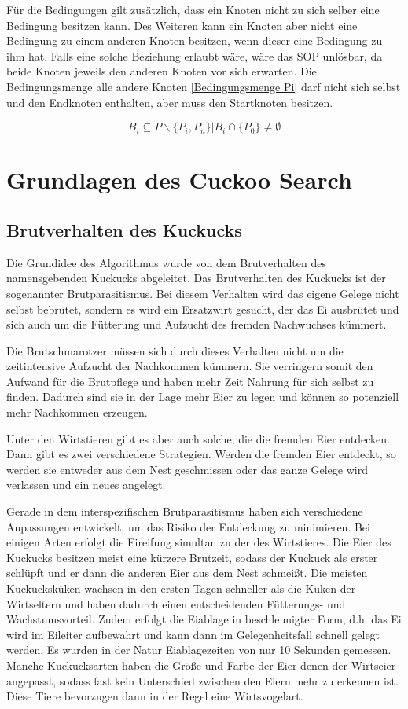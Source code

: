 \documentclass[conference]{IEEEtran}
\begin{document}
      Für die Bedingungen gilt zusätzlich, dass ein Knoten nicht zu sich selber eine Bedingung besitzen kann.
      Des Weiteren kann ein Knoten aber nicht eine Bedingung zu einem anderen Knoten besitzen, wenn dieser eine Bedingung zu ihm hat. 
      Falls eine solche Beziehung erlaubt wäre, wäre das SOP unlösbar, da beide Knoten jeweils den anderen Knoten vor sich erwarten.
      Die Bedingungsmenge alle andere Knoten \eqref{Bedingungsmenge Pi} darf nicht sich selbst und den Endknoten enthalten, aber muss den Startknoten
      besitzen.

      \begin{equation}\label{Bedingungsmenge Pi}
          B_i \subseteq P\backslash\{P_i, P_n\} | B_i \cap \{P_0\} \neq \emptyset
      \end{equation}


  \section{Grundlagen des Cuckoo Search}
    \subsection{Brutverhalten des Kuckucks}
Die Grundidee des Algorithmus wurde von dem Brutverhalten des namensgebenden Kuckucks abgeleitet. Das Brutverhalten des Kuckucks ist der sogenannter Brutparasitismus. Bei diesem Verhalten wird das eigene Gelege nicht selbst bebrütet, sondern es wird ein Ersatzwirt gesucht, der das Ei ausbrütet und sich auch um die Fütterung und Aufzucht des fremden Nachwuchses kümmert.

Die Brutschmarotzer müssen sich durch dieses Verhalten nicht um die zeitintensive Aufzucht der Nachkommen kümmern. Sie verringern somit den Aufwand für die Brutpflege und haben mehr Zeit Nahrung für sich selbst zu finden. Dadurch sind sie in der Lage mehr Eier zu legen und können so potenziell mehr Nachkommen erzeugen. 

Unter den Wirtstieren gibt es aber auch solche, die die fremden Eier entdecken. Dann gibt es zwei verschiedene Strategien. Werden die fremden Eier entdeckt, so werden sie entweder aus dem Nest geschmissen oder das ganze Gelege wird verlassen und ein neues angelegt. 

Gerade in dem interspezifischen Brutparasitismus haben sich verschiedene Anpassungen entwickelt, um das Risiko der Entdeckung zu minimieren. Bei einigen Arten erfolgt die Eireifung simultan zu der des Wirtstieres. Die Eier des Kuckucks besitzen meist eine kürzere Brutzeit, sodass der Kuckuck als erster schlüpft und er dann die anderen Eier aus dem Nest schmeißt. Die meisten Kuckucksküken wachsen in den ersten Tagen schneller als die Küken der Wirtseltern und haben dadurch einen entscheidenden Fütterungs- und Wachstumsvorteil.  Zudem erfolgt die Eiablage in beschleunigter Form, d.h. das Ei wird im Eileiter aufbewahrt und kann dann im Gelegenheitsfall schnell gelegt werden. Es wurden in der Natur Eiablagezeiten von nur 10 Sekunden gemessen. Manche Kuckucksarten haben die Größe und Farbe der Eier denen der Wirtseier angepasst, sodass fast kein Unterschied zwischen den Eiern mehr zu erkennen ist. Diese Tiere bevorzugen dann in der Regel eine Wirtsvogelart.         
\end{document}

